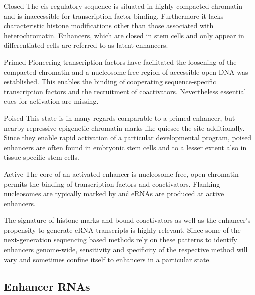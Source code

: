 \begin{mydescription}{0.5cm}
	\item[Closed] The cis-regulatory sequence is situated in highly compacted chromatin and is inaccessible for transcription factor binding. Furthermore it lacks characteristic histone modifications other than those associated with heterochromatin. Enhancers, which are closed in stem cells and only appear in differentiated cells are referred to as latent enhancers.
	\item[Primed] Pioneering transcription factors have facilitated the loosening of the compacted chromatin\cite{Mayran2018} and a nucleosome-free region of accessible open DNA was established. This enables the binding of cooperating sequence-specific transcription factors and the recruitment of coactivators. Nevertheless essential cues for activation are missing. 
	\item[Poised] This state is in many regards comparable to a primed enhancer, but nearby repressive epigenetic chromatin marks like \histwentyseventhree quiesce the site additionally. Since they enable rapid activation of a particular developmental program, poised enhancers are often found in embryonic stem cells and to a lesser extent also in tissue-specific stem cells. 
	\item[Active] The core of an activated enhancer is nucleosome-free, open chromatin permits the binding of transcription factors and coactivators. Flanking nucleosomes are typically marked by \histwentysevenac\cite{Creyghton2010} and eRNAs are produced at active enhancers. 
\end{mydescription}

The signature of histone marks\cite{Ernst2010,CaloWysocka2013} and bound coactivators as well as the enhancer's propensity to generate eRNA transcripts is highly relevant. Since some of the next-generation sequencing based methods  rely on these patterns to identify enhancers genome-wide, sensitivity and specificity of the respective method will vary and sometimes confine itself to enhancers in a particular state. 


\subsection{Enhancer RNAs}
\label{chap:i:enhancers:erna}

